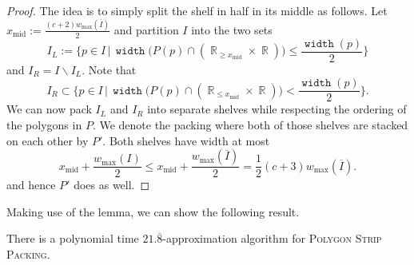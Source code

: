 \documentclass[a4paper,UKenglish,cleveref, autoref, thm-restate]{lipics_v2021}
\DeclareMathOperator{\width}{\mathtt{width}}
\DeclareMathOperator{\R}{\mathbb{R}}
\begin{document}
\begin{proof}
The idea is to simply split the shelf in half in its middle as follows. Let $x_{\text{mid}} := \frac{(c+2)w_{\max}(\overline{I})}{2}$ and partition $I$ into the two sets
\[
I_L:=\bigg \{p \in I \, | \, \width \big(P(p) \cap (\R_{\geq x_{\text{mid}}} \times \R) \big) \leq \frac{\width(p)}{2} \bigg \}
\]
and $I_R = I \backslash I_L$. Note that
\[
I_R \subset \bigg \{p \in I \, | \, \width \big(P(p) \cap (\R_{\leq x_{\text{mid}}} \times \R) \big) < \frac{\width(p)}{2}\bigg\}.
\]
We can now pack $I_L$ and $I_R$ into separate shelves while respecting the ordering of the polygons in $P$. We denote the packing where both of those shelves are stacked on each other by $P'$. Both shelves have width at most
\[
x_{\text{mid}} + \frac{w_{\max}(I)}{2} \leq x_{\text{mid}} + \frac{w_{\max}(\overline{I})}{2} = \frac{1}{2}(c+3)w_{\max}(\overline{I}).
\]
and hence $P'$ does as well.
\end{proof}

Making use of the lemma, we can show the following result.

\begin{theorem}
There is a polynomial time $21.\overline{8}$-approximation algorithm for \textsc{Polygon Strip Packing}.
\end{theorem}
\end{document}
